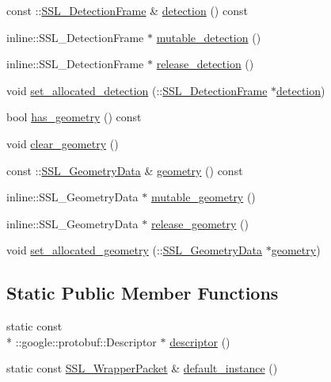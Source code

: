 \begin{DoxyCompactItemize}
\item 
const \-::\hyperlink{class_s_s_l___detection_frame}{S\-S\-L\-\_\-\-Detection\-Frame} \& \hyperlink{class_s_s_l___wrapper_packet_a3d39a7f638ed7ed7ef54e36063ab2da0}{detection} () const 
\item 
inline\-::\-S\-S\-L\-\_\-\-Detection\-Frame $\ast$ \hyperlink{class_s_s_l___wrapper_packet_a4df31ae3dfbfa8ed7ce170c2cca69b5c}{mutable\-\_\-detection} ()
\item 
inline\-::\-S\-S\-L\-\_\-\-Detection\-Frame $\ast$ \hyperlink{class_s_s_l___wrapper_packet_ae7caa8d6d7be9d307092880ec551b454}{release\-\_\-detection} ()
\item 
void \hyperlink{class_s_s_l___wrapper_packet_a2cb859d69920520e3bff3f17b3ee03d3}{set\-\_\-allocated\-\_\-detection} (\-::\hyperlink{class_s_s_l___detection_frame}{S\-S\-L\-\_\-\-Detection\-Frame} $\ast$\hyperlink{class_s_s_l___wrapper_packet_a3d39a7f638ed7ed7ef54e36063ab2da0}{detection})
\item 
bool \hyperlink{class_s_s_l___wrapper_packet_a2e7200a2acecac7c9ea2dfabaf82fb35}{has\-\_\-geometry} () const 
\item 
void \hyperlink{class_s_s_l___wrapper_packet_a46319275a2d17d65785458c177ce40a7}{clear\-\_\-geometry} ()
\item 
const \-::\hyperlink{class_s_s_l___geometry_data}{S\-S\-L\-\_\-\-Geometry\-Data} \& \hyperlink{class_s_s_l___wrapper_packet_af6c6b8ad0595b3c3502caa43dfa19361}{geometry} () const 
\item 
inline\-::\-S\-S\-L\-\_\-\-Geometry\-Data $\ast$ \hyperlink{class_s_s_l___wrapper_packet_ad92426e30e04ce4e6c3c6fad363d01cc}{mutable\-\_\-geometry} ()
\item 
inline\-::\-S\-S\-L\-\_\-\-Geometry\-Data $\ast$ \hyperlink{class_s_s_l___wrapper_packet_a8eb91119398395565c9d9b733711bdad}{release\-\_\-geometry} ()
\item 
void \hyperlink{class_s_s_l___wrapper_packet_acfa80ced643a761a8c3c5322d73f8c3b}{set\-\_\-allocated\-\_\-geometry} (\-::\hyperlink{class_s_s_l___geometry_data}{S\-S\-L\-\_\-\-Geometry\-Data} $\ast$\hyperlink{class_s_s_l___wrapper_packet_af6c6b8ad0595b3c3502caa43dfa19361}{geometry})
\end{DoxyCompactItemize}
\subsection*{Static Public Member Functions}
\begin{DoxyCompactItemize}
\item 
static const \\*
\-::google\-::protobuf\-::\-Descriptor $\ast$ \hyperlink{class_s_s_l___wrapper_packet_a9b623003bab2077cab8a90273e0b5453}{descriptor} ()
\item 
static const \hyperlink{class_s_s_l___wrapper_packet}{S\-S\-L\-\_\-\-Wrapper\-Packet} \& \hyperlink{class_s_s_l___wrapper_packet_a1fbc5a97f510d5629aa8badac6fb5968}{default\-\_\-instance} ()
\end{DoxyCompactItemize}
